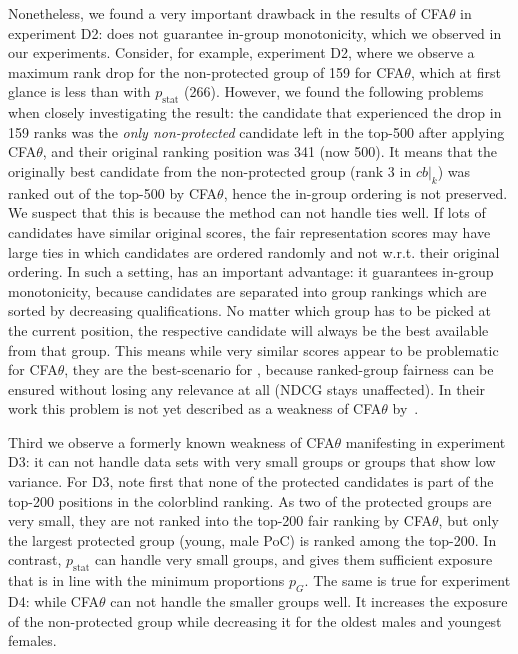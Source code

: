 Nonetheless, we found a very important drawback in the results of CFA$\theta$ in experiment D2: \citet{zehlike2020matching} does not guarantee in-group monotonicity, which we observed in our experiments.
%
Consider, for example, experiment D2, where we observe a maximum rank drop for the non-protected group of 159 for CFA$\theta$, which at first glance is less than \algoFAIR with $p_{\text{stat}}$ (266).
%
However, we found the following problems when closely investigating the result: the candidate that experienced the drop in 159 ranks was the \emph{only non-protected} candidate left in the top-500 after applying CFA$\theta$, and their original ranking position was 341 (now 500).
%
It means that the originally best candidate from the non-protected group (rank 3 in $cb|_k$) was ranked out of the top-500 by CFA$\theta$, hence the in-group ordering is not preserved.
%
We suspect that this is because the method can not handle ties well.
%
If lots of candidates have similar original scores, the fair representation scores may have large ties in which candidates are ordered randomly and not w.r.t. their original ordering.
%
In such a setting, \algoFAIR has an important advantage: it guarantees in-group monotonicity, because candidates are separated into group rankings which are sorted by decreasing qualifications.
%
No matter which group has to be picked at the current position, the respective candidate will always be the best available from that group.
%
This means while very similar scores appear to be problematic for CFA$\theta$, they are the best-scenario for \algoFAIR, because ranked-group fairness can be ensured without losing any relevance at all (NDCG stays unaffected).
%
In their work this problem is not yet described as a weakness of CFA$\theta$ by~\citet{zehlike2020matching}.

Third we observe a formerly known weakness of CFA$\theta$ manifesting in experiment D3: it can not handle data sets with very small groups or groups that show low variance.
%
For D3, note first that none of the protected candidates is part of the top-200 positions in the colorblind ranking.
%
As two of the protected groups are very small, they are not ranked into the top-200 fair ranking by CFA$\theta$, but only the largest protected group (young, male PoC) is ranked among the top-200.
%
In contrast, \algoFAIR $p_{\text{stat}}$ can handle very small groups, and gives them sufficient exposure that is in line with the minimum proportions $p_G$.
%
The same is true for experiment D4: while CFA$\theta$ can not handle the smaller groups well.
%
It increases the exposure of the non-protected group while decreasing it for the oldest males and youngest females.

